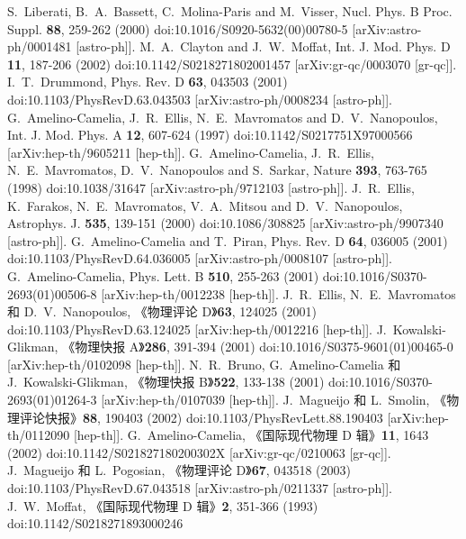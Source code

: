 \documentclass[jkps,preprint,fleqn]{revtex4}
\begin{document}
\begin{CJK*}{UTF8}{gbsn}
\begin{thebibliography}{999}
S.~Liberati, B.~A.~Bassett, C.~Molina-Paris and M.~Visser,
Nucl. Phys. B Proc. Suppl. \textbf{88}, 259-262 (2000)
doi:10.1016/S0920-5632(00)00780-5
[arXiv:astro-ph/0001481 [astro-ph]].
M.~A.~Clayton and J.~W.~Moffat,
Int. J. Mod. Phys. D \textbf{11}, 187-206 (2002)
doi:10.1142/S0218271802001457
[arXiv:gr-qc/0003070 [gr-qc]].
I.~T.~Drummond,
Phys. Rev. D \textbf{63}, 043503 (2001)
doi:10.1103/PhysRevD.63.043503
[arXiv:astro-ph/0008234 [astro-ph]].
G.~Amelino-Camelia, J.~R.~Ellis, N.~E.~Mavromatos and D.~V.~Nanopoulos,
Int. J. Mod. Phys. A \textbf{12}, 607-624 (1997)
doi:10.1142/S0217751X97000566
[arXiv:hep-th/9605211 [hep-th]].
G.~Amelino-Camelia, J.~R.~Ellis, N.~E.~Mavromatos, D.~V.~Nanopoulos and S.~Sarkar,
Nature \textbf{393}, 763-765 (1998)
doi:10.1038/31647
[arXiv:astro-ph/9712103 [astro-ph]].
J.~R.~Ellis, K.~Farakos, N.~E.~Mavromatos, V.~A.~Mitsou and D.~V.~Nanopoulos,
Astrophys. J. \textbf{535}, 139-151 (2000)
doi:10.1086/308825
[arXiv:astro-ph/9907340 [astro-ph]].
G.~Amelino-Camelia and T.~Piran,
Phys. Rev. D \textbf{64}, 036005 (2001)
doi:10.1103/PhysRevD.64.036005
[arXiv:astro-ph/0008107 [astro-ph]].
G.~Amelino-Camelia,
Phys. Lett. B \textbf{510}, 255-263 (2001)
doi:10.1016/S0370-2693(01)00506-8
[arXiv:hep-th/0012238 [hep-th]].
J.~R.~Ellis, N.~E.~Mavromatos 和 D.~V.~Nanopoulos,
《物理评论 D》\textbf{63}, 124025 (2001)
doi:10.1103/PhysRevD.63.124025
[arXiv:hep-th/0012216 [hep-th]].
J.~Kowalski-Glikman,
《物理快报 A》\textbf{286}, 391-394 (2001)
doi:10.1016/S0375-9601(01)00465-0
[arXiv:hep-th/0102098 [hep-th]].
N.~R.~Bruno, G.~Amelino-Camelia 和 J.~Kowalski-Glikman,
《物理快报 B》\textbf{522}, 133-138 (2001)
doi:10.1016/S0370-2693(01)01264-3
[arXiv:hep-th/0107039 [hep-th]].
J.~Magueijo 和 L.~Smolin,
《物理评论快报》\textbf{88}, 190403 (2002)
doi:10.1103/PhysRevLett.88.190403
[arXiv:hep-th/0112090 [hep-th]].
G.~Amelino-Camelia,
《国际现代物理 D 辑》\textbf{11}, 1643 (2002)
doi:10.1142/S021827180200302X
[arXiv:gr-qc/0210063 [gr-qc]].
J.~Magueijo 和 L.~Pogosian,
《物理评论 D》\textbf{67}, 043518 (2003)
doi:10.1103/PhysRevD.67.043518
[arXiv:astro-ph/0211337 [astro-ph]].
J.~W.~Moffat,
《国际现代物理 D 辑》\textbf{2}, 351-366 (1993)
doi:10.1142/S0218271893000246

\end{thebibliography}
\end{CJK*}
\end{document}
